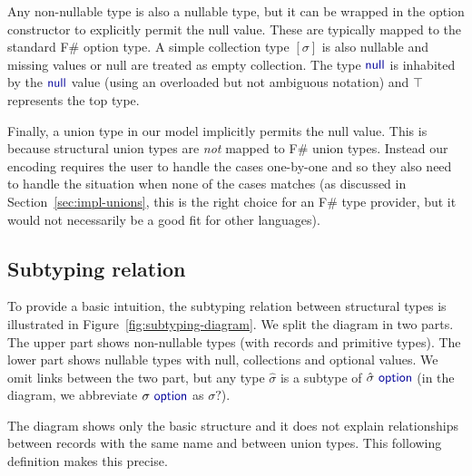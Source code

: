 \documentclass[preprint]{sigplanconf}
\newcommand{\kvd}[1]{\textnormal{\textcolor{kvdclr}{\sffamily #1}}}
\begin{document}
Any non-nullable type is also a nullable type, but it can be wrapped in the \kvd{option}
constructor to explicitly permit the \kvd{null} value. These are typically mapped to the standard F\# option 
type. A simple collection type $[\sigma]$ is also nullable and missing values or \kvd{null} are treated as 
empty collection. The type $\kvd{null}$ is inhabited by the $\kvd{null}$ value (using an overloaded but not
ambiguous notation) and $\top$ represents the top type.

Finally, a union type in our model implicitly permits the \kvd{null} value. This is because structural union 
types are \emph{not} mapped to F\# union types. Instead our encoding requires the user to handle the 
cases one-by-one and so they also need to handle the situation when none of the cases matches (as discussed
in Section~\ref{sec:impl-unions}, this is the right choice for an F\# type provider, but it would not 
necessarily be a good fit for other languages).



\subsection{Subtyping relation}
\label{sec:inference-subtyping}

To provide a basic intuition, the subtyping relation between structural types is illustrated in
Figure~\ref{fig:subtyping-diagram}. We split the diagram in two parts. The upper part shows 
non-nullable types (with records and primitive types). The lower part shows nullable types with 
\kvd{null}, collections and optional values. We omit links between the two part, but any type
$\hat{\sigma}$ is a subtype of $\hat{\sigma}~\kvd{option}$ (in the diagram, we abbreviate 
$\sigma~\kvd{option}$ as $\sigma?$).

The diagram shows only the basic structure and it does not explain relationships between records
with the same name and between union types. This following definition makes this precise.
\end{document}
